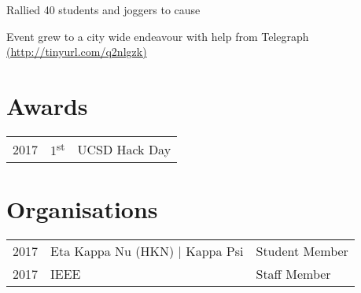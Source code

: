 \documentclass[]{deedy-resume-openfont}
\begin{document}
\begin{minipage}[t]{0.66\textwidth}
\begin{tightemize}
\item Rallied 40 students and joggers to cause
\item Event grew to a city wide endeavour with help from Telegraph \href{http://tinyurl.com/q2nlgzk}{(http://tinyurl.com/q2nlgzk)}
\end{tightemize}
\sectionsep


\section{Awards} 
\begin{tabular}{rll}
2017	     & 1\textsuperscript{st}  & UCSD Hack Day\\
\end{tabular}
\sectionsep


\section{Organisations}
\begin{tabular}{rll}
2017    & Eta Kappa Nu (HKN) | Kappa Psi &Student Member\\
2017   & IEEE  & Staff Member\\
\end{tabular}
\sectionsep

\end{minipage} 
\end{document}

